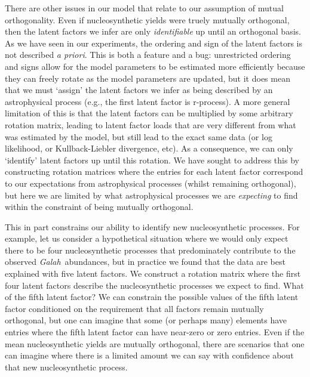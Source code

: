 \documentclass[twocolumn]{aastex62}
\newcommand{\project}[1]{\textsl{#1}}
\newcommand{\Galah}{\project{Galah}}
\begin{document}
There are other issues in our model that relate to our assumption of mutual
orthogonality. Even if nucleosynthetic yields were truely mutually orthogonal,
then the latent factors we infer are only \emph{identifiable} up until an
orthogonal basis. As we have seen in our experiments, the ordering and sign 
of the latent factors is not described \emph{a priori}. This is both a feature
and a bug: unrestricted ordering and signs allow for the model parameters to be
estimated more efficiently because they can freely rotate as the model
parameters are updated, but it does mean that we
must `assign' the latent factors we infer as being described by an astrophysical
process (e.g., the first latent factor is r-process). A more general limitation
of this is that the latent factors can be multiplied by some arbitrary rotation
matrix, leading to latent factor loads that are very different from what was
estimated by the model, but still lead to the exact same data (or log likelihood,
or Kullback-Liebler divergence, etc). As a consequence, we can only `identify'
latent factors up until this rotation. We have sought to address this by constructing
rotation matrices where the entries for each latent factor correspond to our expectations
from astrophysical processes (whilst remaining orthogonal), but here we are limited
by what astrophysical processes we are \emph{expecting} to find within the constraint
of being mutually orthogonal.


This in part constrains our ability to identify new nucleosynthetic processes. For example,
let us consider a hypothetical situation where we would only expect there to be four 
nucleosynthetic processes that predominately contribute to the observed \Galah\ abundances,
but in practice we found that the data are best explained with
five latent factors. We construct a rotation matrix where the first four latent factors
describe the nucleosynthetic processes we expect to find. What of the fifth latent
factor? We can constrain the possible values of the fifth latent factor conditioned on
the requirement that all factors remain mutually orthogonal, but one can imagine that
some (or perhaps many) elements have entries where the fifth latent factor can have
near-zero or zero entries. Even if the mean nucleosynthetic yields are mutually
orthogonal, there are scenarios that one can imagine where there is a limited amount
we can say with confidence about that new nucleosynthetic process.
\end{document}

